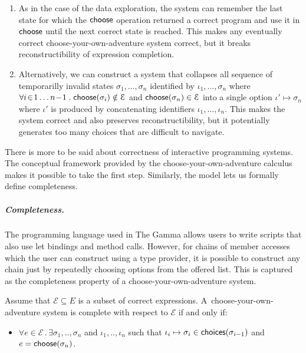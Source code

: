 \documentclass[anonymous, a4paper,UKenglish,cleveref, autoref, thm-restate]{lipics-v2021}
\newcommand{\ident}[1]{\textsf{#1}}
\newcommand{\select}{\textnormal{\ident{choose}}}
\newcommand{\choices}{\textnormal{\ident{choices}}}
\begin{document}
\begin{enumerate}
\setlength{\itemsep}{5pt}
\item As in the case of the data exploration, the system can remember the last state for which
  the $\select$ operation returned a correct program and use it in $\select$ until the next correct state is
  reached. This makes any eventually correct choose-your-own-adventure system correct, but it
  breaks reconstructibility of expression completion.

\item Alternatively, we can construct a system that collapses all sequence of temporarilly invalid states
  $\sigma_1, \ldots, \sigma_n$ identified by $\iota_1, \ldots, \sigma_n$ where
  $\forall i\!\in\! 1\ldots n\!-\! 1\;.\;\select(\sigma_i)\notin\mathcal{E}$ and $\select(\sigma_n)\in\mathcal{E}$
  into a single option $\iota' \mapsto \sigma_n$ where $\iota'$ is produced by concatenating
  identifiers $\iota_1,\ldots,\iota_n$.
  This makes the system correct and also preserves reconstructibility, but it potentially
  generates too many choices that are difficult to navigate.
\end{enumerate}

There is more to be said about correctness of interactive programming systems. The
conceptual framework provided by the choose-your-own-adventure calculus makes it possible to
take the first step. Similarly, the model lets us formally define completeness.

\subparagraph{Completeness.}
The programming language used in The Gamma allows users to write scripts that also use let bindings
and method calls. However, for chains of member accesses which the user can construct using
a type provider, it is possible to construct any chain just by repeatedly choosing options from
the offered list. This is captured as the completeness property of a choose-your-own-adventure system.

\begin{definition}[Completeness]
Assume that $\mathcal{E}\subseteq E$ is a subset of correct expressions.
A~choose-your-own-adventure system is complete with respect to $\mathcal{E}$ if and only if:
\begin{itemize}
\item $\forall e\!\in\!\mathcal{E}\,.\,\exists \sigma_1,..,\sigma_n$ and $\iota_1,..,\iota_n$ such that
  $\iota_i\mapsto\sigma_i \in \choices(\sigma_{i-1})$ and $e=\select(\sigma_n)$.
\end{itemize}
\end{definition}
\end{document}
